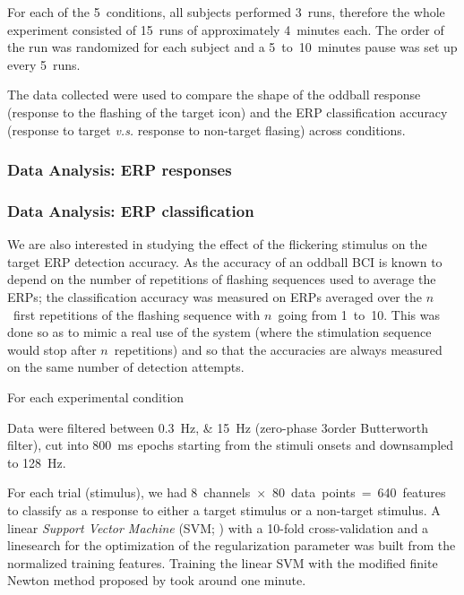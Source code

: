 \documentclass[10pt]{article}
\begin{document}
        For each of the 5~conditions, all subjects performed 3~runs, therefore the whole experiment consisted of 15~runs of approximately 4~minutes each.
        The order of the run was randomized for each subject and a 5~to~10~minutes pause was set up every 5~runs.

        The data collected were used to compare the shape of the oddball response (response to the flashing of the target icon) and the \ac{ERP} classification accuracy (response to target \emph{v.s.} response to non-target flasing) across conditions.

        \subsubsection{Data Analysis: \acs{ERP} responses}
        \label{sec:2.2.2AnalysisErpShape}



        \subsubsection{Data Analysis: \acs{ERP} classification}
        \label{sec:2.2.3AnalysisErpClassification}

        We are also interested in studying the effect of the flickering stimulus on the target \ac{ERP} detection accuracy.
        As the accuracy of an oddball \ac{BCI} is known to depend on the number of repetitions of flashing sequences used to average the \acp{ERP}; the classification accuracy was measured on \acp{ERP} averaged over the $n$~first repetitions of the flashing sequence with $n$~going from 1~to~10.
        This was done so as to mimic a real use of the system (where the stimulation sequence would stop after $n$~repetitions) and so that the accuracies are always measured on the same number of detection attempts.

        For each experimental condition


        Data were filtered between \SIlist[list-units = single]{0.3;15}{\Hz} (zero-phase 3\rd order Butterworth filter), cut into \SI{800}{\ms} epochs starting from the stimuli onsets and downsampled to \SI{128}{\Hz}.

        For each trial (stimulus), we had 8~channels~$\times$~80~data~points~=~640~features to classify as a response to either a target stimulus or a non-target stimulus.
        A linear \emph{Support Vector Machine} (SVM; \cite{Cristianini2000,Suykens2002}) with a 10-fold cross-validation and a linesearch for the optimization of the regularization parameter was built from the normalized training features.
        Training the linear SVM with the modified finite Newton method proposed by \textcite{Keerthi2006} took around one minute.
\end{document}

